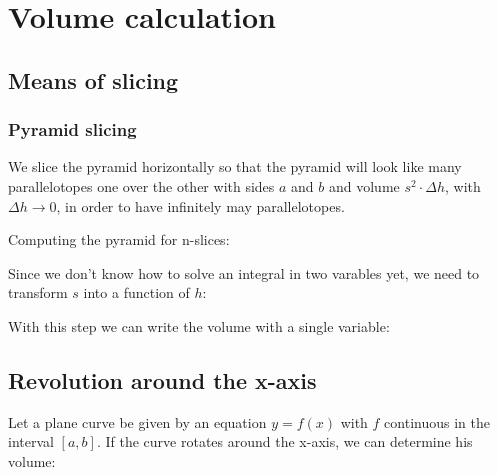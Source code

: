 \documentclass{article}
\begin{document}
\section{Volume calculation}
\subsection{Means of slicing}
\subsubsection{Pyramid slicing}
We slice the pyramid horizontally so that the pyramid will look like
many parallelotopes one over the other with sides $a$ and $b$ and volume $s^2 \cdot \Delta h$,
with $\Delta h \to 0$, in order to have infinitely may parallelotopes.

Computing the pyramid for n-slices:

Since we don't know how to solve an integral in two varables yet,
we need to transform $s$ into a function of $h$:

With this step we can write the volume with a single variable:


\newpage
\subsection{Revolution around the x-axis}
Let a plane curve be given by an equation $y=f(x)$ with $f$ continuous
in the interval $[a,b]$. If the curve rotates around the x-axis, we can
determine his volume:
\end{document}
